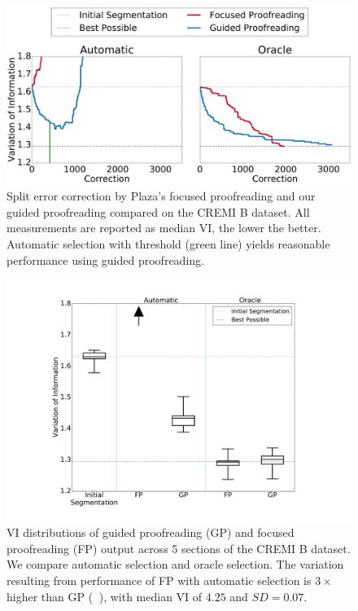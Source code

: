 \begin{figure}[t]
\centering
\includegraphics[width=\linewidth]{gfx/cremiB_trails.pdf}
\caption{Split error correction by Plaza's focused proofreading and our guided proofreading compared on the CREMI B dataset. All measurements are reported as median VI, the lower the better. Automatic selection with threshold (green line) yields reasonable performance using guided proofreading.}
\label{fig:cremiBtrails}
\end{figure}

\begin{figure}[t]
\centering
\includegraphics[width=\linewidth]{gfx/cremiBboxplot.pdf}
\caption{VI distributions of guided proofreading (GP) and focused proofreading (FP) output across 5 sections of the CREMI B dataset. We compare automatic selection and oracle selection. The variation resulting from performance of FP with automatic selection is $3\times$ higher than GP (\protect\includegraphics[width=0.2cm]{gfx/arrow.pdf}), with median VI of $4.25$ and $SD=0.07$.}
\label{fig:cremiBboxplot}
\end{figure}

